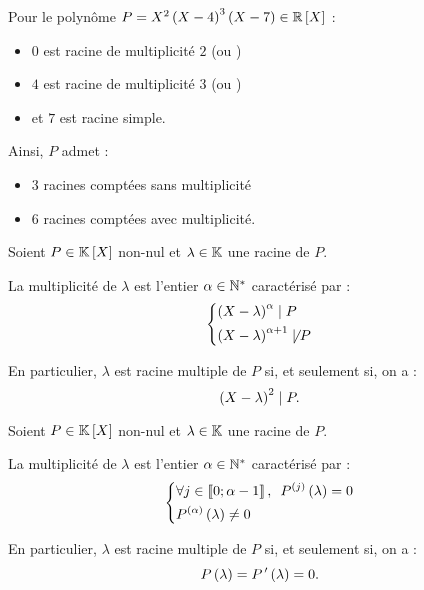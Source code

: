 \begin{ex}
Pour le polynôme \(P=X^2\paren{X-4}^3\paren{X-7}\in\poly[\R]\) :

\begin{itemize}
\item \(0\) est racine de multiplicité \(2\) (ou ) \\

\item \(4\) est racine de multiplicité \(3\) (ou ) \\

\item et \(7\) est racine simple.
\end{itemize}

Ainsi, \(P\) admet :

\begin{itemize}
\item \(3\) racines comptées sans multiplicité \\

\item \(6\) racines comptées avec multiplicité.
\end{itemize}
\end{ex}

\begin{rem}
Soient \(P\in\poly\) non-nul et \(\lambda\in\mathbb{K}\) une racine de \(P\).

La multiplicité de \(\lambda\) est l'entier \(\alpha\in\mathbb{N}^*\) caractérisé par : \[\begin{dcases}\left(X-\lambda\right)^{\alpha}\mid P \\ \left(X-\lambda\right)^{\alpha+1}\not\mid P\end{dcases}\]

En particulier, \(\lambda\) est racine multiple de \(P\) si, et seulement si, on a : \[\left(X-\lambda\right)^2\mid P.\]
\end{rem}

\begin{prop}
Soient \(P\in\poly\) non-nul et \(\lambda\in\mathbb{K}\) une racine de \(P\).

La multiplicité de \(\lambda\) est l'entier \(\alpha\in\mathbb{N}^*\) caractérisé par : \[\begin{dcases}\quantifs{\forall j\in\interventierii{0}{\alpha-1}}P\deriv{j}\paren{\lambda}=0 \\ P\deriv{\alpha}\paren{\lambda}\not=0\end{dcases}\]

En particulier, \(\lambda\) est racine multiple de \(P\) si, et seulement si, on a : \[P\left(\lambda\right)=P^{\,\prime}\left(\lambda\right)=0.\]
\end{prop}

